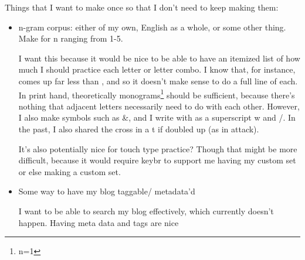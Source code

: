 Things that I want to make once so that I don't need to keep making them:  
\begin{itemize}  
\item n-gram corpus: either of my own, English as a whole, or some other thing. Make for n ranging from 1-5.

I want this because it would be nice to be able to have an itemized list of how much I should practice each letter or letter combo.  
I know that, for instance,  comes up far less than , and so it doesn't make sense to do a full line of each.  
In print hand, theoretically monograms\footnote{n=1} should be sufficient, because there's nothing that adjacent letters necessarily need to do with each other.  
However, I also make symbols such as \&, and I write with as a superscript w and /.  
In the past, I also shared the cross in a t if doubled up (as in attack).

It's also potentially nice for touch type practice? Though that might be more difficult, because it would require keybr to support me having my custom set or else making a custom set.

\item Some way to have my blog taggable/ metadata'd

I want to be able to search my blog effectively, which currently doesn't happen.  
Having meta data and tags are nice  
\end{itemize}